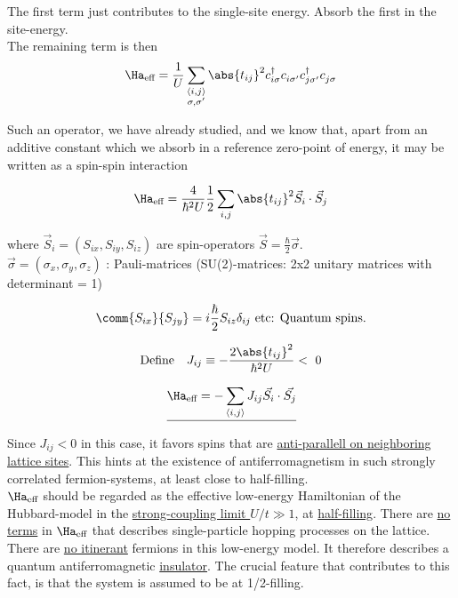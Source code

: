 The first term just contributes to the single-site energy. Absorb the first in the site-energy. \\

The remaining term is then \begin{equation}
    \Ha_{\text{eff}} = \frac{1}{U} \sum_{\substack{\langle i, j \rangle \\ \sigma, \sigma'}} \abs{t_{ij}}^2 c_{i \sigma}^\dagger c_{i \sigma'}^{} c_{j \sigma'}^\dagger c_{j \sigma}^{}
\end{equation}

Such an operator, we have already studied, and we know that, apart from an additive constant which we absorb in a reference zero-point of energy, it may be written as a spin-spin interaction

\begin{equation}
    \Ha_{\text{eff}} = \frac{4}{\hbar^2 U} \frac{1}{2} \sum_{i, j} \abs{t_{ij}}^2 \Vec{S}_i \cdot \Vec{S}_j
\end{equation}

where $\Vec{S}_i = (S_{ix}, S_{iy}, S_{iz})$ are spin-operators $\Vec{S} = \frac{\hbar}{2} \Vec{\sigma}$. \\

$\Vec{\sigma} = (\sigma_x, \sigma_y, \sigma_z)$ : Pauli-matrices (SU(2)-matrices: 2x2 unitary matrices with determinant = 1)

\begin{equation}
    \comm{S_{ix}}{S_{jy}} = i\frac{\hbar}{2}S_{iz}\delta_{ij} \ \text{etc: Quantum spins}.
\end{equation}

\begin{equation}
    \text{Define} \quad J_{ij} \equiv - \frac{2 \abs{t_{ij}}^2}{\hbar^2 U} < \ 0
\end{equation}

\begin{equation} \underline{
    \Ha_{\text{eff}} = -\sum_{\langle i, j \rangle} J_{ij} \Vec{S_i} \cdot \Vec{S_j}}
\end{equation}

 Since $J_{ij} < 0$ in this case, it favors spins that are \underline{anti-parallell on neighboring lattice sites}. This hints at the existence of antiferromagnetism in such strongly correlated fermion-systems, at least close to half-filling. \\

$\Ha_{\text{eff}}$ should be regarded as the effective low-energy Hamiltonian of the Hubbard-model in the \underline{strong-coupling limit $U/t \gg 1$}, at \underline{half-filling}. There are \underline{no terms} in $\Ha_{\text{eff}}$ that describes single-particle hopping processes on the lattice. There are \underline{no itinerant} fermions in this low-energy model. It therefore describes a quantum antiferromagnetic \underline{insulator}. The crucial feature that contributes to this fact, is that the system is assumed to be at 1/2-filling. \\


